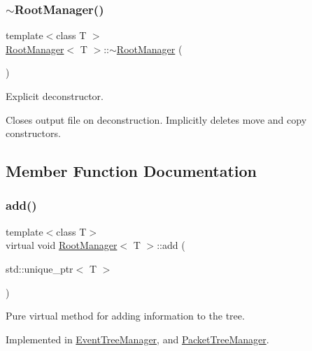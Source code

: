 \subsubsection{\texorpdfstring{$\sim$\+Root\+Manager()}{~RootManager()}}
{\footnotesize\ttfamily template$<$class T $>$ \\
\hyperlink{class_root_manager}{Root\+Manager}$<$ T $>$\+::$\sim$\hyperlink{class_root_manager}{Root\+Manager} (\begin{DoxyParamCaption}{ }\end{DoxyParamCaption})\hspace{0.3cm}{\ttfamily [virtual]}}



Explicit deconstructor. 

Closes output file on deconstruction. Implicitly deletes move and copy constructors. 

\subsection{Member Function Documentation}
\mbox{\label{class_root_manager_a2f05eb45d5eaee1f9f12e299395652fb}} 
\subsubsection{\texorpdfstring{add()}{add()}}
{\footnotesize\ttfamily template$<$class T$>$ \\
virtual void \hyperlink{class_root_manager}{Root\+Manager}$<$ T $>$\+::add (\begin{DoxyParamCaption}\item[{std\+::unique\+\_\+ptr$<$ T $>$}]{ }\end{DoxyParamCaption})\hspace{0.3cm}{\ttfamily [pure virtual]}}



Pure virtual method for adding information to the tree. 



Implemented in \hyperlink{class_event_tree_manager_acabb2f6c8dd0e08375b4cf8bf2c148fd}{Event\+Tree\+Manager}, and \hyperlink{class_packet_tree_manager_a855e71512fe6365c11f312584afff70a}{Packet\+Tree\+Manager}.

\mbox{\label{class_root_manager_aa1eaed1aa026059b8d00e729161c6a43}} 
